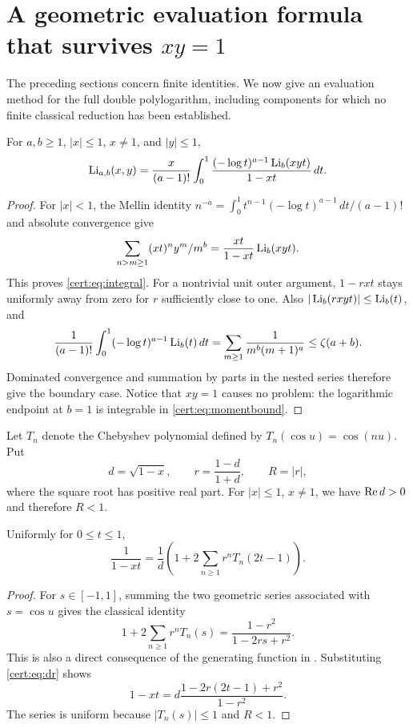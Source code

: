 \section{A geometric evaluation formula that survives \texorpdfstring{$xy=1$}{xy=1}}
\label{cert:sec:spectral}
The preceding sections concern finite identities. We now give an evaluation
method for the full double polylogarithm, including components for which
no finite classical reduction has been established.

\begin{lemma}
\label{cert:lem:integral}
For $a,b\ge1$, $|x|\le1$, $x\ne1$, and $|y|\le1$,
\begin{equation}
 \operatorname{Li}_{a,b}(x,y)=\frac{x}{(a-1)!}
  \int_0^1\frac{(-\log t)^{a-1}\operatorname{Li}_b(xyt)}{1-xt}\,dt.
\label{cert:eq:integral}
\end{equation}
\end{lemma}
\begin{proof}
For $|x|<1$, the Mellin identity
$n^{-a}=\int_0^1 t^{n-1}(-\log t)^{a-1}\,dt/(a-1)!$
and absolute convergence give
\[
 \sum_{n>m\ge1}(xt)^ny^m/m^b
 =\frac{xt}{1-xt}\operatorname{Li}_b(xyt).
\]
This proves \eqref{cert:eq:integral}. For a nontrivial unit outer argument,
$1-rxt$ stays uniformly away from zero for $r$ sufficiently close to one.
Also $|\operatorname{Li}_b(rxyt)|\le\operatorname{Li}_b(t)$, and
\begin{equation}
 \frac1{(a-1)!}\int_0^1(-\log t)^{a-1}\operatorname{Li}_b(t)\,dt
 =\sum_{m\ge1}\frac1{m^b(m+1)^a}\le\zeta(a+b).
\label{cert:eq:momentbound}
\end{equation}
Dominated convergence and summation by parts in the nested series therefore give the boundary
case. Notice that $xy=1$ causes no problem: the logarithmic endpoint at
$b=1$ is integrable in \eqref{cert:eq:momentbound}.
\end{proof}

Let $T_n$ denote the Chebyshev polynomial defined by
$T_n(\cos u)=\cos(nu)$. Put
\begin{equation}
 d=\sqrt{1-x},\qquad r=\frac{1-d}{1+d},\qquad R=|r|,
\label{cert:eq:dr}
\end{equation}
where the square root has positive real part. For $|x|\le1$, $x\ne1$,
we have $\operatorname{Re} d>0$ and therefore $R<1$.

\begin{lemma}
\label{cert:lem:kernel}
Uniformly for $0\le t\le1$,
\begin{equation}
 \frac1{1-xt}=\frac1d\left(1+2\sum_{n\ge1}r^nT_n(2t-1)\right).
\label{cert:eq:kernel}
\end{equation}
\end{lemma}
\begin{proof}
For $s\in[-1,1]$, summing the two geometric series associated with
$s=\cos u$ gives the classical identity
\[
 1+2\sum_{n\ge1}r^nT_n(s)=\frac{1-r^2}{1-2rs+r^2}.
\]
This is also a direct consequence of the generating function in
\cite{hstruct:DLMF}. Substituting \eqref{cert:eq:dr} shows
\[
 1-xt=d\frac{1-2r(2t-1)+r^2}{1-r^2}.
\]
The series is uniform because $|T_n(s)|\le1$ and $R<1$.
\end{proof}

